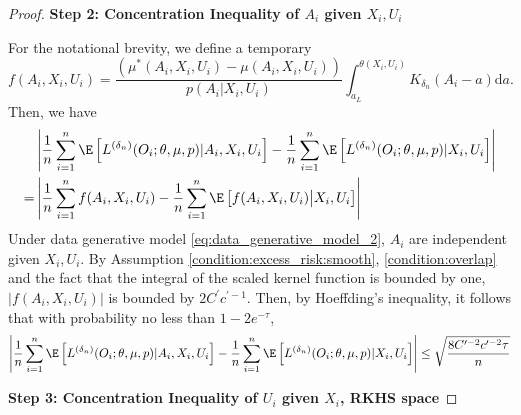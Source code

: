 \begin{proof}
\noindent \textbf{Step 2: Concentration Inequality of $A_i$ given $X_i,U_i$}

\noindent For the notational brevity, we define a temporary
$$f(A_i,X_i,U_i) = \frac{(\mu^*(A_i,X_i,U_i) - \mu(A_i,X_i,U_i))}{ p(A_{i}|X_{i},U_{i})} \int_{a_L}^{\theta(X_i,U_i)}K_{\delta_n}(A_i-a)\mathrm{d}a.$$
Then, we have 
\begin{align*}
    &\left|\frac{1}{n}\sum_{i=1}^n\E\left[L^{({\delta_n})}(O_i;\theta,\mu, p)|A_i,X_i,U_i\right]-\frac{1}{n}\sum_{i=1}^n\E\left[L^{({\delta_n})}(O_i;\theta,\mu, p)|X_i,U_i\right]\right|\\
    = &\left|\frac{1}{n}\sum_{i=1}^n f(A_i,X_i,U_i) - \frac{1}{n}\sum_{i=1}^n\E\left[f(A_i,X_i,U_i)\big| X_i,U_i\right]\right|
\end{align*}
Under data generative model \ref{eq:data_generative_model_2}, $A_i$ are independent given $X_i,U_i$. By Assumption \ref{condition:excess_risk:smooth}, \ref{condition:overlap} and the fact that the integral of the scaled kernel function is bounded by one, $|f(A_i,X_i,U_i)|$ is bounded by $2C^\prime c^{\prime-1}$. Then, by Hoeffding's inequality, it follows that with probability no less than $1-2e^{-\tau}$,
$$\left|\frac{1}{n}\sum_{i=1}^n\E\left[L^{({\delta_n})}(O_i;\theta,\mu, p)|A_i,X_i,U_i\right]-\frac{1}{n}\sum_{i=1}^n\E\left[L^{({\delta_n})}(O_i;\theta,\mu, p)|X_i,U_i\right]\right|\leq \sqrt{\frac{8C^{\prime-2}c^{\prime-2}\tau}{n}}$$



\noindent \textbf{Step 3: Concentration Inequality of $ U_i$ given $X_i$, RKHS space}


\end{proof}
